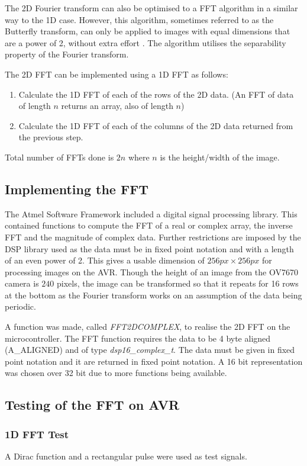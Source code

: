 The 2D Fourier transform can also be optimised to a FFT algorithm in a similar way to the 1D case. However, this algorithm, sometimes referred to as the Butterfly transform, can only be applied to images with equal dimensions that are a power of 2, without extra effort \citep{nixon2012feature}. The algorithm utilises the separability property of the Fourier transform. 

The 2D FFT can be implemented using a 1D FFT as follows:
\begin{enumerate}
\item Calculate the 1D FFT of each of the rows of the 2D data. (An FFT of data of length $n$ returns an array, also of length $n$)
\item Calculate the 1D FFT of each of the columns of the 2D data returned from the previous step.
\end{enumerate}
Total number of FFTs done is $2n$ where $n$ is the height/width of the image. 
\subsection{Implementing the FFT}
The Atmel Software Framework \citep{Atmel:ASF} included a digital signal processing library. This contained functions to compute the FFT of a real or complex array, the inverse FFT and the magnitude of complex data. Further restrictions are imposed by the DSP library used as the data must be in fixed point notation and with a length of an even power of 2. This gives a usable dimension of $256px \times 256px$ for processing images on the AVR. Though the height of an image from the OV7670 camera is $240$ pixels, the image can be transformed so that it repeats for 16 rows at the bottom as the Fourier transform works on an assumption of the data being periodic.

A function was made, called \textit{FFT2DCOMPLEX}, to realise the 2D FFT on the microcontroller. The FFT function requires the data to be 4 byte aligned (A\_ALIGNED) and of type \textit{dsp16\_complex\_t}. The data must be given in fixed point notation and it are returned in fixed point notation. A 16 bit representation was chosen over 32 bit due to more functions being available. 


\subsection{Testing of the FFT on AVR}
\subsubsection{1D FFT Test}
A Dirac function and a rectangular pulse were used as test signals. 

